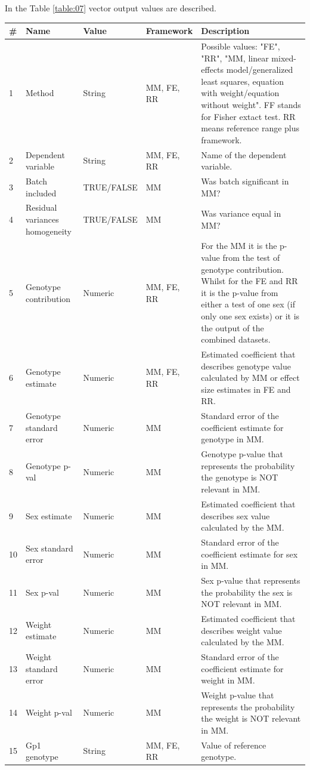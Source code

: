\documentclass[12pt,a4paper]{article}
\begin{document}
In the Table \ref{table:07} vector output values are described.
\begin{table}
 
\begin{tabular}{| l | l | l | l | p{10cm} |}
  \hline
\#&Name&Value&Framework&Description\\\hline
1&Method&String&MM, FE, RR&Possible values: "FE", "RR", "MM, linear mixed-effects model/generalized least squares, equation with weight/equation without weight". FF stands for Fisher extact test. RR means reference range plus framework.\\
2&Dependent variable&String&MM, FE, RR&Name of the dependent variable.\\
3&Batch included&TRUE/FALSE&MM&Was batch significant in MM?\\
4&Residual variances homogeneity&TRUE/FALSE&MM&Was variance equal in MM?\\
5&Genotype contribution&Numeric&MM, FE, RR&For the MM it is the p-value from the test of genotype contribution.  Whilst for the FE and RR it is the p-value from either a test of one sex (if only one sex exists) or it is the output of the combined datasets.\\
6&Genotype estimate&Numeric&MM, FE, RR&Estimated coefficient that describes genotype value calculated by MM or effect size estimates in FE and RR.\\
7&Genotype standard error&Numeric&MM&Standard error of the coefficient estimate for genotype in MM.\\
8&Genotype p-val&Numeric&MM&Genotype p-value that represents the probability the genotype is NOT relevant in MM.\\
9&Sex estimate&Numeric&MM&Estimated coefficient that describes sex value calculated by the MM.\\
10&Sex standard error&Numeric&MM&Standard error of the coefficient estimate for sex in MM.\\
11&Sex p-val&Numeric&MM&Sex p-value that represents the probability the sex is NOT relevant in MM.\\
12&Weight estimate&Numeric&MM&Estimated coefficient that describes weight value calculated by the MM.\\
13&Weight standard error&Numeric&MM&Standard error of the coefficient estimate for weight in MM.\\
14&Weight p-val&Numeric&MM&Weight p-value that represents the probability the weight is NOT relevant in MM.\\
15&Gp1 genotype&String&MM, FE, RR&Value of reference genotype.\\

\end{tabular}
\end{table}
\end{document}
